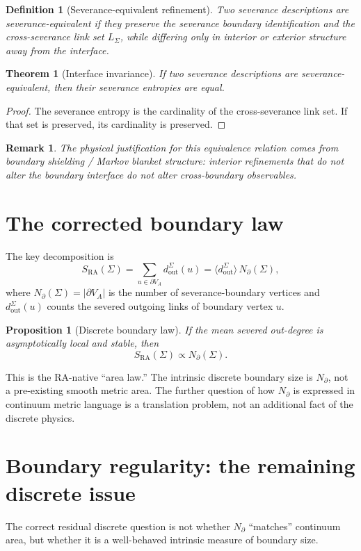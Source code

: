 \documentclass[11pt]{article}
\newtheorem{definition}{Definition}
\newtheorem{theorem}{Theorem}
\newtheorem{proposition}{Proposition}
\newtheorem{remark}{Remark}
\newcommand{\SRa}{S_{\mathrm{RA}}}
\begin{document}
\begin{definition}[Severance-equivalent refinement]
Two severance descriptions are severance-equivalent if they preserve the severance boundary identification and the cross-severance link set $L_\Sigma$, while differing only in interior or exterior structure away from the interface.
\end{definition}

\begin{theorem}[Interface invariance]
If two severance descriptions are severance-equivalent, then their severance entropies are equal.
\end{theorem}

\begin{proof}
The severance entropy is the cardinality of the cross-severance link set. If that set is preserved, its cardinality is preserved.
\end{proof}

\begin{remark}
The physical justification for this equivalence relation comes from boundary shielding / Markov blanket structure: interior refinements that do not alter the boundary interface do not alter cross-boundary observables.
\end{remark}

\section{The corrected boundary law}
The key decomposition is
\[
\SRa(\Sigma)=\sum_{u\in \partial V_A} d^{\Sigma}_{\mathrm{out}}(u)
=\langle d^{\Sigma}_{\mathrm{out}}\rangle\,N_\partial(\Sigma),
\]
where $N_\partial(\Sigma)=|\partial V_A|$ is the number of severance-boundary vertices and $d^{\Sigma}_{\mathrm{out}}(u)$ counts the severed outgoing links of boundary vertex $u$.

\begin{proposition}[Discrete boundary law]
If the mean severed out-degree is asymptotically local and stable, then
\[
\SRa(\Sigma)\propto N_\partial(\Sigma).
\]
\end{proposition}

This is the RA-native ``area law.'' The intrinsic discrete boundary size is $N_\partial$, not a pre-existing smooth metric area. The further question of how $N_\partial$ is expressed in continuum metric language is a translation problem, not an additional fact of the discrete physics.

\section{Boundary regularity: the remaining discrete issue}
The correct residual discrete question is not whether $N_\partial$ ``matches'' continuum area, but whether it is a well-behaved intrinsic measure of boundary size.
\end{document}

